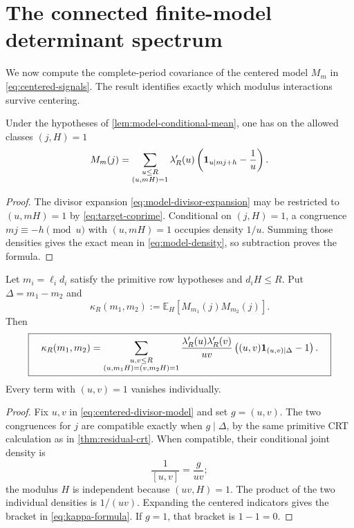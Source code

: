 \section{The connected finite-model determinant spectrum}
\label{sec:model-spectrum}

We now compute the complete-period covariance of the centered model
\(M_m\) in \eqref{eq:centered-signals}.  The result identifies exactly
which modulus interactions survive centering.

\begin{lemma}
\label{lem:centered-divisor-model}
Under the hypotheses of \cref{lem:model-conditional-mean}, one has on
the allowed classes \((j,H)=1\)
\begin{equation}
 M_m(j)=
 \sum_{\substack{u\le R\\(u,mH)=1}}
 \lambda'_R(u)
 \left(\mathbf 1_{u\mid mj+h}-\frac1u\right).
 \label{eq:centered-divisor-model}
\end{equation}
\end{lemma}

\begin{proof}
The divisor expansion \eqref{eq:model-divisor-expansion} may be
restricted to \((u,mH)=1\) by \eqref{eq:target-coprime}.  Conditional
on \((j,H)=1\), a congruence \(mj\equiv-h\pmod u\) with
\((u,mH)=1\) occupies density \(1/u\).  Summing those densities gives
the exact mean in \eqref{eq:model-density}, so subtraction proves the
formula.
\end{proof}

\begin{theorem}
\label{thm:model-covariance}
Let \(m_i=\ell_i d_i\) satisfy the primitive row hypotheses and
\(d_iH\le R\).  Put \(\Delta=m_1-m_2\) and
\begin{equation}
 \kappa_R(m_1,m_2):=\mathbb E_H[M_{m_1}(j)M_{m_2}(j)].
 \label{eq:kappa-definition}
\end{equation}
Then
\begin{equation}
 \boxed{\quad
 \kappa_R(m_1,m_2)
 =\sum_{\substack{u,v\le R\\
 (u,m_1H)=(v,m_2H)=1}}
 \frac{\lambda'_R(u)\lambda'_R(v)}{uv}
 \left((u,v)\mathbf 1_{(u,v)\mid\Delta}-1\right).
 \quad}
 \label{eq:kappa-formula}
\end{equation}
Every term with \((u,v)=1\) vanishes individually.
\end{theorem}

\begin{proof}
Fix \(u,v\) in \eqref{eq:centered-divisor-model} and set
\(g=(u,v)\).  The two congruences for \(j\) are compatible exactly
when \(g\mid\Delta\), by the same primitive CRT calculation as in
\cref{thm:residual-crt}.  When compatible, their conditional joint
density is
\[
 \frac1{[u,v]}=\frac g{uv};
\]
the modulus \(H\) is independent because \((uv,H)=1\).  The product of
the two individual densities is \(1/(uv)\).  Expanding the centered
indicators gives the bracket in \eqref{eq:kappa-formula}.  If \(g=1\),
that bracket is \(1-1=0\).
\end{proof}

